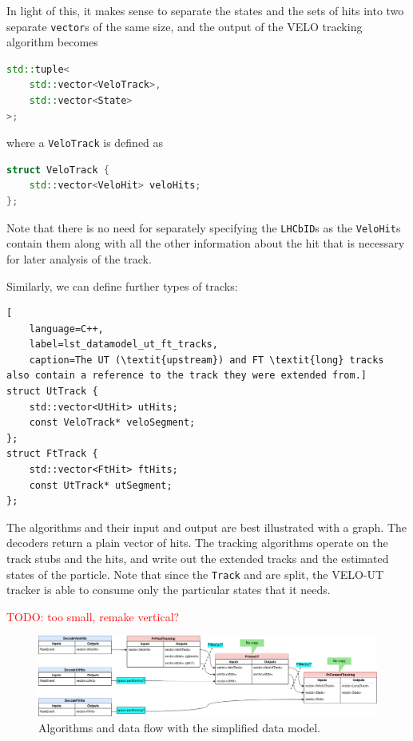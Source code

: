 \documentclass[12pt]{article}
\newcommand{\code}[1]{\texttt{#1}}
\begin{document}
In light of this, it makes sense to separate the states and the sets of hits into two separate \code{vector}s of the same size, and the output of the VELO tracking algorithm becomes
\begin{lstlisting}[language=C++]
std::tuple<
	std::vector<VeloTrack>,
	std::vector<State>
>;
\end{lstlisting}
where a \code{VeloTrack} is defined as 
\begin{lstlisting}[language=C++]
struct VeloTrack {
	std::vector<VeloHit> veloHits;
};
\end{lstlisting}

Note that there is no need for separately specifying the \code{LHCbID}s as the \code{VeloHit}s contain them along with all the other information about the hit that is necessary for later analysis of the track.

\vspace{1pc}

Similarly, we can define further types of tracks:
\begin{lstlisting}[
	language=C++,
	label=lst_datamodel_ut_ft_tracks,
	caption=The UT (\textit{upstream}) and FT \textit{long} tracks also contain a reference to the track they were extended from.]
struct UtTrack {
	std::vector<UtHit> utHits;
	const VeloTrack* veloSegment;
};
struct FtTrack {
	std::vector<FtHit> ftHits;
	const UtTrack* utSegment;
};
\end{lstlisting}

The algorithms and their input and output are best illustrated with a graph. The decoders return a plain vector of hits. The tracking algorithms operate on the track stubs and the hits, and write out the extended tracks and the estimated states of the particle. Note that since the \code{Track} and are split, the VELO-UT tracker is able to consume only the particular states that it needs.

\textcolor{red}{TODO: too small, remake vertical?}
\begin{figure}[H]
	\begin{center}
		\includegraphics[width=1\textwidth]{datamodel_track_flow}
	\end{center}
	\caption{Algorithms and data flow with the simplified data model.}
	\label{fig_datamodel_track_flow}
\end{figure}
\end{document}
